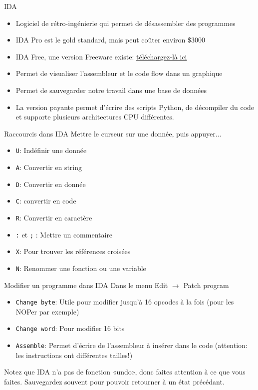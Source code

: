 \documentclass[10pt,xcolor={table,dvipsnames},t]{beamer}
\begin{document}
\begin{frame}{IDA}

    \begin{itemize}
        \item Logiciel de rétro-ingénierie qui permet de désassembler des programmes
        \item IDA Pro est le gold standard, mais peut coûter environ \$3000
        \item IDA Free, une version Freeware existe: \href{https://www.hex-rays.com/products/ida/support/download_freeware.shtml}{téléchargez-là ici} 
        \item Permet de visualiser l'assembleur et le code flow dans un graphique
        \item Permet de sauvegarder notre travail dans une base de données
        \item La version payante permet d'écrire des scripts Python, de décompiler du code et supporte plusieurs architectures CPU différentes.
    \end{itemize}
\end{frame}


\begin{frame}{Raccourcis dans IDA}
    Mettre le curseur sur une donnée, puis appuyer...
    \begin{itemize}
        \item \texttt{U}: Indéfinir une donnée
        \item \texttt{A}: Convertir en string
        \item \texttt{D}: Convertir en donnée
        \item \texttt{C}: convertir en code
        \item \texttt{R}: Convertir en caractère
        \item \texttt{:} et \texttt{;} : Mettre un commentaire
        \item \texttt{X}: Pour trouver les références croisées
        \item \texttt{N}: Renommer une fonction ou une variable
    \end{itemize}
\end{frame}


\begin{frame}{Modifier un programme dans IDA}
    Dans le menu Edit $\rightarrow$  Patch program
    \begin{itemize}
        \item \texttt{Change byte}: Utile pour modifier jusqu'à 16 opcodes à la fois (pour les NOPer par exemple)
        \item \texttt{Change word}: Pour modifier 16 bits
        \item \texttt{Assemble}: Permet d'écrire de l'assembleur à insérer dans le code (attention: les instructions ont différentes tailles!)
    \end{itemize}
    
    Notez que IDA n'a pas de fonction «undo», donc faites attention à ce que vous faites. Sauvegardez souvent pour pouvoir retourner à un état précédant.
\end{frame}
\end{document}
